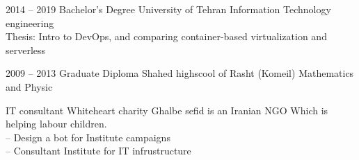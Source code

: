 \documentclass[9pt]{developercv}
\begin{document}



\begin{entrylist}
	\entry
	{2014 -- 2019}
	{Bachelor's Degree}
	{University of Tehran}
	{Information Technology engineering\\
		Thesis: Intro to DevOps, and comparing container-based virtualization and serverless
	}
\end{entrylist}

\begin{entrylist}
	\entry
	{2009 -- 2013}
	{Graduate Diploma}
	{Shahed highscool of Rasht (Komeil)}
	{Mathematics and Physic \\}
\end{entrylist}


\begin{entrylist}
	\entry
	{}
	{IT consultant}
	{Whiteheart charity}
	{Ghalbe sefid is an Iranian NGO Which is helping labour children. \\
		-- Design a bot for Institute campaigns \\
		-- Consultant Institute for IT infrustructure}
\end{entrylist}
\end{document}

